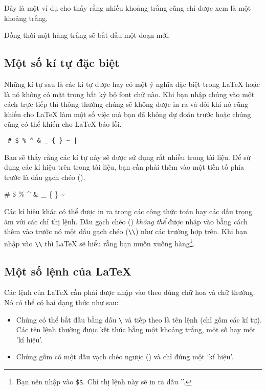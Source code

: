 \begin{example}
Đây là một ví dụ cho thấy
rằng nhiều            khoảng
trắng cũng
chỉ được xem là
một             khoảng trắng.


Đồng thời một hàng trắng
sẽ bắt đầu một đoạn mới.
\end{example}

\subsection{Một số kí tự đặc biệt}
Những kí tự sau là các kí tự được  hay có một ý nghĩa đặc biệt trong \LaTeX{} hoặc là nó không có mặt trong bất kỳ bộ font chữ nào. Khi bạn nhập chúng vào một cách trực tiếp thì thông thường chúng sẽ không được in ra và đôi khi nó cũng khiến cho \LaTeX{} làm một số việc mà bạn đã không dự đoán trước hoặc chúng cũng có thể khiến cho \LaTeX{} báo lỗi. %

\begin{code}
\verb. # $ % ^ & _ { } ~ | . %
\end{code}
Bạn sẽ thấy rằng các kí tự này sẽ được sử dụng rất nhiều trong tài
liệu. Để sử dụng các kí hiệu trên trong tài liệu, bạn cần phải thêm vào một tiền tố phía trước là dấu gạch chéo (\bs{}).
\begin{example}
\# \$ \% \^{} \& \_ \{ \} \~{}
\end{example}

Các kí hiệu khác có thể được in ra trong các công thức toán hay các dấu trọng âm với các chỉ thị lệnh. Dấu gạch chéo (\bs{})
\emph{không thể} được nhập vào bằng cách thêm vào trước nó một dấu gạch chéo (\verb|\\|) như các trường hợp trên. Khi bạn nhập vào \verb|\\| thì \LaTeX{} sẽ hiểu rằng bạn muốn xuống
hàng\footnote{Bạn nên nhập vào %
\texttt{\$}\texttt{\$}. Chỉ thị lệnh này sẽ in ra %
dấu '\bs{}'.}.

\subsection{Một số lệnh của \LaTeX{}}

Các lệnh của \LaTeX{} cần phải được nhập vào theo đúng chữ hoa và
chữ thường. Nó có thể có hai dạng thức như sau:
\begin{itemize}
        \item Chúng có thể bắt đầu bằng dấu \verb|\| và tiếp theo là tên lệnh (chỉ gồm các kí tự). Các tên lệnh thường được kết thúc bằng một khoảng trắng, một số hay một 'kí hiệu'. 
        \item Chúng gồm có một dấu vạch chéo ngược (\bs{}) và chỉ đúng một `kí hiệu'.
\end{itemize}
%
%
%
%
\label{whitespace}

